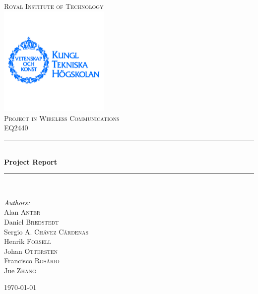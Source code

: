 \documentclass[12pt,a4paper,openright]{report}
\newcommand{\HRule}{\rule{\linewidth}{0.5mm}}
\begin{document}
\begin{titlepage}
\begin{center}
\textsc{\LARGE Royal Institute of Technology}\\[0.3cm]
\includegraphics[width=0.4\textwidth]{./logo}~\\[0.3cm]


\textsc{\Large Project in Wireless Communications \\ EQ2440}\\[0.5cm]

\HRule \\[0.4cm]
{ \huge \bfseries Project Report \\[0.4cm] }

\HRule \\[1.5cm]

\begin{minipage}{0.4\textwidth}
\begin{flushleft} \large
\emph{Authors:}\\
Alan \textsc{Anter} \\
Daniel \textsc{Bredstedt}\\
Sergio A. \textsc{Chávez Cárdenas}\\
Henrik \textsc{Forsell}\\
Johan \textsc{Ottersten}\\
Francisco \textsc{Rosário}\\
Jue \textsc{Zhang}\\

\end{flushleft}
\end{minipage}
\vfill
{\large \today}



\end{center}
\end{titlepage}


\newpage\null\thispagestyle{empty}\newpage
\end{document}
